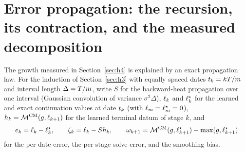 \documentclass[11pt]{article}
\newcommand{\heatSemigroup}{S}       %
\newcommand{\stageDatum}{h}          %
\newcommand{\stageError}{e}          %
\newcommand{\solveError}{\zeta}      %
\newcommand{\smoothMaxBias}{\omega}  %
\theoremstyle{plain}
\theoremstyle{definition}
\theoremstyle{remark}
\begin{document}
\section{Error propagation: the recursion, its contraction, and the measured
  decomposition}\label{sec:recursion}

The growth measured in Section~\ref{sec:h4} is explained by an exact propagation
law. For the induction of Section~\ref{sec:h3} with equally spaced dates
$t_k=kT/m$ and interval length
$\Delta=T/m$, write $\heatSemigroup$ for the
backward-heat propagation over one interval (Gaussian convolution of variance
$\sigma^{2}\Delta$), $\ell_k$ and $\ell^{\star}_k$ for
the learned and exact continuation values at date $t_k$ (with
$\ell_{m}=\ell^{\star}_{m}=0$),
$\stageDatum_k=\smoothMaxCM(\payoff,\continuationValue_{k+1})$ for the learned
terminal datum of stage $k$, and
\begin{equation*}
  \stageError_k=\continuationValue_k-\continuationValue^{\star}_k,
  \qquad
  \solveError_k=\continuationValue_k-\heatSemigroup\stageDatum_k,
  \qquad
  \smoothMaxBias_{k+1}
  =\smoothMaxCM(\payoff,\continuationValue^{\star}_{k+1})
   -\max(\payoff,\continuationValue^{\star}_{k+1})
\end{equation*}
for the per-date error, the per-stage solve error, and the smoothing bias.
\end{document}
